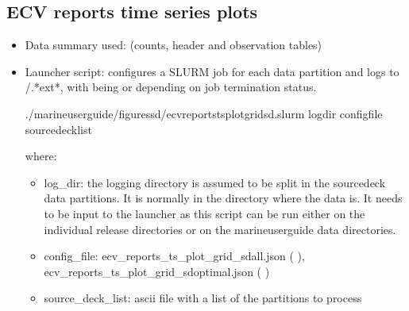 \documentclass[letterpaper,10pt,english]{sphinxmanual}
\begin{document}
\subsection{ECV reports time series plots}
\label{\detokenize{index:ecv-reports-time-series-plots}}\begin{itemize}
\item {} 
Data summary used: {\hyperref[\detokenize{index:monthly-grids-sd-section}]{}} (counts, header and observation tables)

\item {} 
Launcher script: configures a SLURM job for each  data partition and logs to /.*ext*, with  being  or  depending on job termination status.

\begin{sphinxVerbatim}[commandchars=\\\{\}]
./marine\PYGZhy{}user\PYGZhy{}guide/figures\PYGZus{}sd/ecv\PYGZus{}reports\PYGZus{}ts\PYGZus{}plot\PYGZus{}grid\PYGZus{}sd.slurm log\PYGZus{}dir config\PYGZus{}file source\PYGZus{}deck\PYGZus{}list
\end{sphinxVerbatim}

where:
\begin{itemize}
\item {} 
log\_dir: the logging directory is assumed to be split in the source\sphinxhyphen{}deck data
partitions. It is normally  in the directory where the data is.
It needs to be input to the launcher as this script can be run either on the
individual release directories or on the marine\sphinxhyphen{}user\sphinxhyphen{}guide data directories.

\item {} 
config\_file: ecv\_reports\_ts\_plot\_grid\_sd\sphinxhyphen{}all.json ( {\hyperref[\detokenize{index:ecv-noreports-config-sd-all}]{}}), ecv\_reports\_ts\_plot\_grid\_sd\sphinxhyphen{}optimal.json  ( {\hyperref[\detokenize{index:ecv-noreports-config-sd-optimal}]{}} )

\item {} 
source\_deck\_list: ascii file with a list of the  partitions to process

\end{itemize}

\end{itemize}
\end{document}
